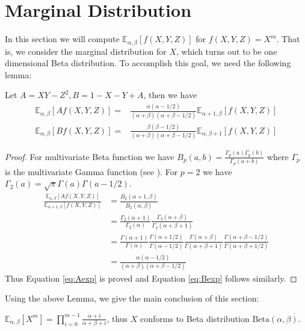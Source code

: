 \documentclass[twoside]{article}%
\def\E{\mathbb{E}}
\def\Beta{\textrm{Beta}}
\begin{document}
\section{Marginal Distribution}
In this section we will compute $\E_{\alpha,\beta}[f(X,Y, Z)]$
for $f(X,Y,Z)=X^m$. That is, we consider the marginal distribution for $X$,
which turns out to be one dimensional Beta distribution.
To accomplish this goal, we need the following lemma:
\begin{lemma}\label{lem:AB}
Let $A = XY - Z^2, B = 1 - X - Y + A$, then we have
\begin{align}
\E_{\alpha, \beta}[Af(X,Y,Z)] =&
\frac{\alpha(\alpha-1/2)}{(\alpha+\beta)(\alpha+\beta-1/2)}\E_{\alpha+1, \beta}[f(X,Y,Z)]
\label{eq:Aexp} \\
\E_{\alpha,\beta}[Bf(X,Y,Z)] =&
\frac{\beta(\beta-1/2)}{(\alpha+\beta)(\alpha+\beta-1/2)}\E_{\alpha, \beta+1}[f(X,Y,Z)]
\label{eq:Bexp}
\end{align}
\end{lemma}
\begin{proof}
For multivariate Beta function we have
$B_p(a, b) = \frac{\Gamma_p(a)\Gamma_p(b)}{\Gamma_p(a+b)}$
where $\Gamma_p$ is the multivariate Gamma function (see \cite{ingham_1933}).
For $p=2$ we have $\Gamma_2(a) = \sqrt{\pi}\Gamma(a)\Gamma(a-1/2)$.
\begin{align*}
\frac{\E_{\alpha, \beta}[Af(X,Y,Z)]}{\E_{\alpha+1, \beta}[f(X,Y,Z)]} &
=\frac{B_2(\alpha+1,\beta)}{B_2(\alpha,\beta)}\\
&=\frac{\Gamma_2(\alpha+1)}{\Gamma_2(\alpha)}
\frac{\Gamma_2(\alpha+\beta)}{\Gamma_2(\alpha+\beta+1)}\\
& =\frac{\Gamma(\alpha+1)}{\Gamma(\alpha)}
\frac{\Gamma(\alpha+1/2)}{\Gamma(\alpha-1/2)}
\frac{\Gamma(\alpha+\beta)}{\Gamma(\alpha+\beta+1)}
\frac{\Gamma(\alpha+\beta-1/2)}{\Gamma(\alpha+\beta+1/2)}\\
&=\frac{\alpha(\alpha-1/2)}{(\alpha+\beta)(\alpha+\beta-1/2)}
\end{align*}
Thus Equation \eqref{eq:Aexp} is proved and Equation \eqref{eq:Bexp} follows similarly.
\end{proof}
Using the above Lemma, we give the main conclusion of this section:
\begin{theorem}\label{thm:Xm}
$\E_{\alpha, \beta}[X^m] =
\prod_{i=0}^{m-1}\frac{\alpha+i}{\alpha+\beta+i}$, thus $X$
conforms to Beta distribution $\Beta(\alpha, \beta)$.
\end{theorem}
\end{document}
